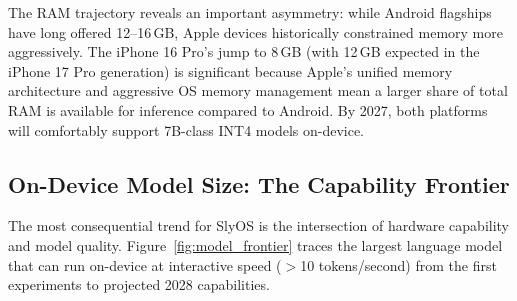 \documentclass[12pt, letterpaper, twoside]{report}
\begin{document}
The RAM trajectory reveals an important asymmetry: while Android flagships have long offered 12--16\,GB, Apple devices historically constrained memory more aggressively. The iPhone 16 Pro's jump to 8\,GB (with 12\,GB expected in the iPhone 17 Pro generation) is significant because Apple's unified memory architecture and aggressive OS memory management mean a larger share of total RAM is available for inference compared to Android. By 2027, both platforms will comfortably support 7B-class INT4 models on-device.

\subsection{On-Device Model Size: The Capability Frontier}

The most consequential trend for SlyOS is the intersection of hardware capability and model quality. Figure~\ref{fig:model_frontier} traces the largest language model that can run on-device at interactive speed ($>$10 tokens/second) from the first experiments to projected 2028 capabilities.
\end{document}
